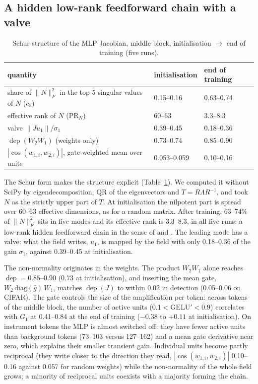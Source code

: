 \documentclass[10pt]{article}
\newcommand{\dep}{\operatorname{dep}}
\begin{document}
\subsection{A hidden low-rank feedforward chain with a valve}
\label{sec:schur}

\begin{table}[t]
\centering
\caption{Schur structure of the MLP Jacobian, middle block, initialisation $\to$ end of training (five runs).}
\label{tab:schur}
\begin{tabular}{lll}
\toprule
quantity & initialisation & end of training\\
\midrule
share of $\|N\|_F^2$ in the top 5 singular values of $N$ ($c_5$) & 0.15--0.16 & 0.63--0.74\\
effective rank of $N$ ($\mathrm{PR}_N$) & 60--63 & 3.3--8.3\\
valve $\|Ju_1\|/\sigma_1$ & 0.39--0.45 & 0.18--0.36\\
$\dep(W_2W_1)$ (weights only) & 0.73--0.74 & 0.85--0.90\\
$|\cos(w_{1,i},w_{2,i})|$, gate-weighted mean over units & 0.053--0.059 & 0.10--0.16\\
\bottomrule
\end{tabular}
\end{table}

The Schur form makes the structure explicit (Table~\ref{tab:schur}). We computed it without SciPy by eigendecomposition, QR of the
eigenvectors and $T=R\Lambda R^{-1}$, and took $N$ as the strictly upper part of $T$. At initialisation the nilpotent part is spread over
60--63 effective dimensions, as for a random matrix. After training, 63--74\% of $\|N\|_F^2$ sits in five modes and its effective rank is
3.3--8.3, in all five runs: a low-rank hidden feedforward chain in the sense of \citet{murphy2009balanced} and \citet{goldman2009memory}.
The leading mode has a valve: what the field writes, $u_1$, is mapped by the field with only 0.18--0.36 of the gain $\sigma_1$, against
0.39--0.45 at initialisation.

The non-normality originates in the weights. The product $W_2W_1$ alone reaches $\dep=0.85$--$0.90$ (0.73 at initialisation), and
inserting the mean gate, $W_2\,\mathrm{diag}(\bar g)\,W_1$, matches $\dep(J)$ to within 0.02 in detection (0.05--0.06 on CIFAR). The gate
controls the size of the amplification per token: across tokens of the middle block, the number of active units ($0.1<\mathrm{GELU}'<0.9$)
correlates with $G_1$ at 0.41--0.84 at the end of training ($-0.38$ to $+0.11$ at initialisation). On instrument tokens the MLP is almost
switched off: they have fewer active units than background tokens (73--103 versus 127--162) and a mean gate derivative near zero, which
explains their smaller transient gain. Individual units become partly reciprocal (they write closer to the direction they read,
$|\cos(w_{1,i},w_{2,i})|$ 0.10--0.16 against 0.057 for random weights) while the non-normality of the whole field grows; a minority of
reciprocal units coexists with a majority forming the chain.
\end{document}
